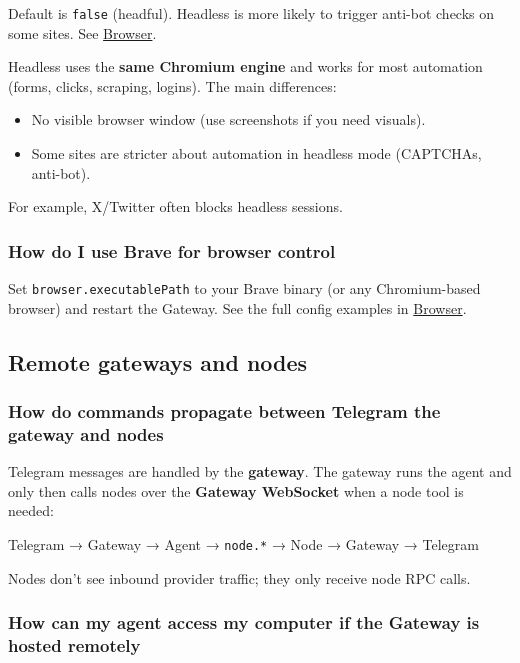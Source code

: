 Default is \texttt{false} (headful). Headless is more likely to trigger anti-bot checks on some sites. See \href{/tools/browser}{Browser}.

Headless uses the \textbf{same Chromium engine} and works for most automation (forms, clicks, scraping, logins). The main differences:

\begin{itemize}
  \item No visible browser window (use screenshots if you need visuals).
  \item Some sites are stricter about automation in headless mode (CAPTCHAs, anti-bot).
\end{itemize}

For example, X/Twitter often blocks headless sessions.

\subsubsection{How do I use Brave for browser control}


Set \texttt{browser.executablePath} to your Brave binary (or any Chromium-based browser) and restart the Gateway.
See the full config examples in \href{/tools/browser\#use-brave-or-another-chromium-based-browser}{Browser}.

\subsection{Remote gateways and nodes}


\subsubsection{How do commands propagate between Telegram the gateway and nodes}


Telegram messages are handled by the \textbf{gateway}. The gateway runs the agent and
only then calls nodes over the \textbf{Gateway WebSocket} when a node tool is needed:

Telegram → Gateway → Agent → \texttt{node.*} → Node → Gateway → Telegram

Nodes don't see inbound provider traffic; they only receive node RPC calls.

\subsubsection{How can my agent access my computer if the Gateway is hosted remotely}



